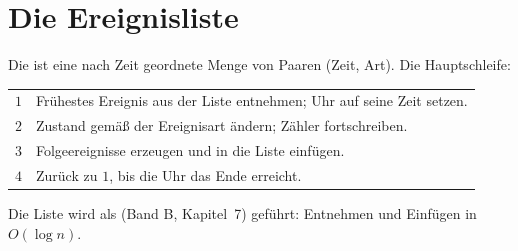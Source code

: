 \section{Die Ereignisliste}

\begin{definition}
Die  ist eine nach Zeit geordnete Menge von Paaren (Zeit, Art). Die Hauptschleife:
\begin{center}
{\small
\renewcommand{\arraystretch}{1.5}
\begin{tabular}{@{}P{0.8cm}P{7.6cm}@{}}
\toprule
$1$ & Frühestes Ereignis aus der Liste entnehmen; Uhr auf seine Zeit setzen.\\
$2$ & Zustand gemäß der Ereignisart ändern; Zähler fortschreiben.\\
$3$ & Folgeereignisse erzeugen und in die Liste einfügen.\\
$4$ & Zurück zu $1$, bis die Uhr das Ende erreicht.\\
\bottomrule
\end{tabular}}
\end{center}
Die Liste wird als  (Band B, Kapitel~7) geführt: Entnehmen und Einfügen in $O(\log n)$.
\end{definition}

